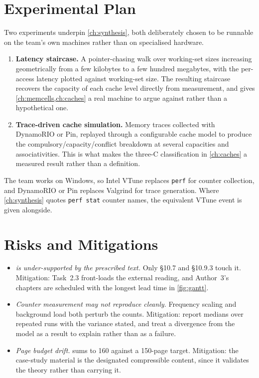 \documentclass[11pt,a4paper]{report}
\begin{document}
\section{Experimental Plan}
\label{sec:plan-experiments}

Two experiments underpin \cref{ch:synthesis}, both deliberately chosen
to be runnable on the team's own machines rather than on specialised
hardware.

\begin{enumerate}[leftmargin=*]
  \item \textbf{Latency staircase.} A pointer-chasing walk over
    working-set sizes increasing geometrically from a few kilobytes to
    a few hundred megabytes, with the per-access latency plotted against
    working-set size. The resulting staircase recovers the capacity of
    each cache level directly from measurement, and gives
    \cref{ch:memcells,ch:caches} a real machine to argue against rather
    than a hypothetical one.
  \item \textbf{Trace-driven cache simulation.} Memory traces collected
    with DynamoRIO or Pin, replayed through a configurable cache model
    to produce the compulsory/capacity/conflict breakdown at several
    capacities and associativities. This is what makes the three-C
    classification in \cref{ch:caches} a measured result rather than a
    definition.
\end{enumerate}

The team works on Windows, so Intel VTune replaces \texttt{perf} for
counter collection, and DynamoRIO or Pin replaces Valgrind for trace
generation. Where \cref{ch:synthesis} quotes \texttt{perf stat} counter
names, the equivalent VTune event is given alongside.

\section{Risks and Mitigations}
\label{sec:plan-risks}

\begin{itemize}[leftmargin=*]
  \item \emph{ is under-supported by the prescribed
  text.} Only \S10.7 and \S10.9.3 touch it. Mitigation: Task~2.3
  front-loads the external reading, and Author~3's chapters are
  scheduled with the longest lead time in \cref{fig:gantt}.
  \item \emph{Counter measurement may not reproduce cleanly.} Frequency
  scaling and background load both perturb the counts. Mitigation:
  report medians over repeated runs with the variance stated, and
  treat a divergence from the model as a result to explain rather than
  as a failure.
  \item \emph{Page budget drift.}  sums to 160
  against a 150-page target. Mitigation: the case-study material is
  the designated compressible content, since it validates the theory
  rather than carrying it.
\end{itemize}
\end{document}
